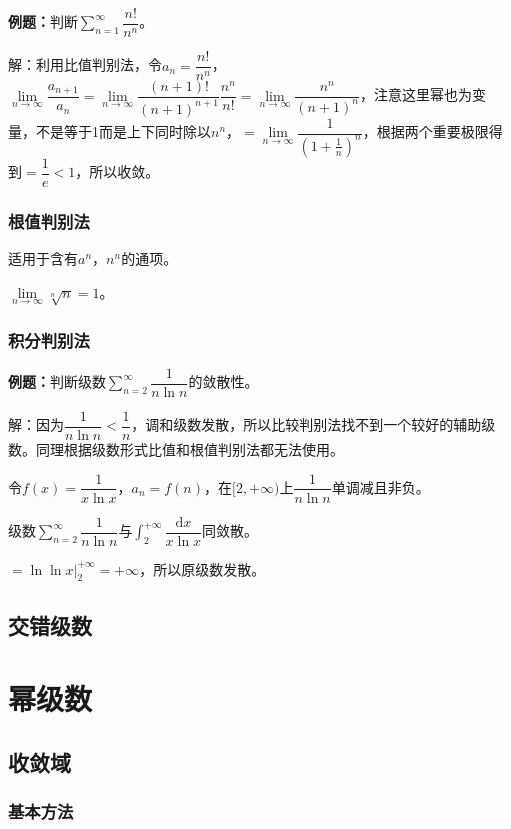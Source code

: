 \documentclass[UTF8, 12pt]{ctexart}
\begin{document}
\textbf{例题：}判断$\sum\limits_{n=1}^\infty\dfrac{n!}{n^n}$。

解：利用比值判别法，令$a_n=\dfrac{n!}{n^n}$，$\lim\limits_{n\to\infty}\dfrac{a_{n+1}}{a_n}=\lim\limits_{n\to\infty}\dfrac{(n+1)!}{(n+1)^{n+1}}\dfrac{n^n}{n!}=\lim\limits_{n\to\infty}\dfrac{n^n}{(n+1)^n}$，注意这里幂也为变量，不是等于1而是上下同时除以$n^n$，$=\lim\limits_{n\to\infty}\dfrac{1}{(1+\frac{1}{n})^n}$，根据两个重要极限得到$=\dfrac{1}{e}<1$，所以收敛。

\subsubsection{根值判别法}

适用于含有$a^n$，$n^n$的通项。

$\lim\limits_{n\to\infty}\sqrt[n]{n}=1$。

\subsubsection{积分判别法}

\textbf{例题：}判断级数$\sum\limits_{n=2}^\infty\dfrac{1}{n\ln n}$的敛散性。

解：因为$\dfrac{1}{n\ln n}<\dfrac{1}{n}$，调和级数发散，所以比较判别法找不到一个较好的辅助级数。同理根据级数形式比值和根值判别法都无法使用。

令$f(x)=\dfrac{1}{x\ln x}$，$a_n=f(n)$，在$[2,+\infty)$上$\dfrac{1}{n\ln n}$单调减且非负。

级数$\sum\limits_{n=2}^\infty\dfrac{1}{n\ln n}$与$\int_2^{+\infty}\dfrac{\textrm{d}x}{x\ln x}$同敛散。

$=\ln\ln x\vert_2^{+\infty}=+\infty$，所以原级数发散。

\subsection{交错级数}

\section{幂级数}

\subsection{收敛域}

\subsubsection{基本方法}
\end{document}
